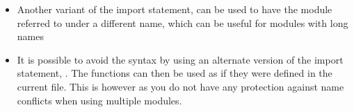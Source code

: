 \documentclass[letterpaper,10pt,english,openany]{sphinxmanual}
\begin{document}
\begin{sphinxVerbatim}[commandchars=\\\{\}]
   

  \PYG{p}{[}\PYG{p}{]}
   
   

  
\end{sphinxVerbatim}
\begin{itemize}
\item {} 
Another variant of the import statement,
 can be used to have
the module referred to under a different name, which can be useful
for modules with long names

\end{itemize}

\begin{sphinxVerbatim}[commandchars=\\\{\}]
   

\end{sphinxVerbatim}
\begin{itemize}
\item {} 
It is possible to avoid the  syntax by using
an alternate version of the import statement,
. The functions can then be used
as if they were defined in the current file. This is 
however as you do not have any protection against name conflicts when
using multiple modules.

\end{itemize}
\end{document}
